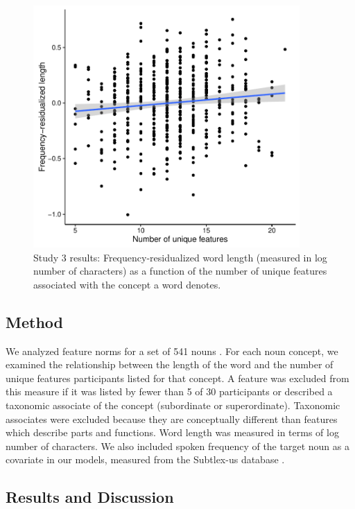   \begin{figure}[t!]
 \begin{center}
  \includegraphics[width=4in]{figs/feature_plot.pdf}
  \caption{\label{fig:feature_plot} Study 3 results: Frequency-residualized word length (measured in log number of characters) as a function of the number of unique features associated with the concept a word denotes. }
 \end{center}
\end{figure}

\subsection{Method}
We analyzed feature norms for a set of 541 nouns \cite{mcrae2005semantic}. For each noun concept, we examined the relationship between the length of the word and the number of unique features participants listed for that concept. A feature was excluded from this measure if it was listed by fewer than 5 of 30 participants or described a taxonomic associate of the concept (subordinate or superordinate). Taxonomic associates were excluded because they are conceptually different than features which describe parts and functions. Word length was measured in terms of log number of characters. We also included spoken frequency of the target noun as a covariate in our models, measured from the Subtlex-us database \cite{brysbaert2009moving}. 

\subsection{Results and Discussion}

